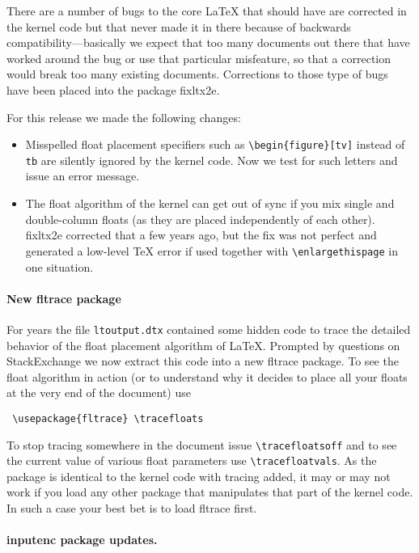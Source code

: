 \documentclass{ltnews}
\begin{document}
There are a number of bugs to the core \LaTeX{} that should have are
corrected in the kernel code but that never made it in there because
of backwards compatibility---basically we expect that too many
documents out there that have worked around the bug or use that
particular misfeature, so that a correction would break too many
existing documents. Corrections to those type of bugs have been placed
into the package \textsf{fixltx2e}.
 

For this release we made the following changes:
\begin{itemize}
\item
   Misspelled float placement specifiers such as
   \verb=\begin{figure}[tv]= instead of \texttt{tb} are silently
   ignored by the kernel code.  Now we test for such letters and issue
   an error message.
\item
   The float algorithm of the kernel can get out of sync if you mix
   single and double-column floats (as they are placed independently
   of each other). \textsf{fixltx2e} corrected that a few years ago,
   but the fix was not perfect and generated a low-level \TeX{} error
   if used together with \verb=\enlargethispage= in one situation.
\end{itemize}




\paragraph{New \textsf{fltrace} package}

For years the file \texttt{ltoutput.dtx} contained some hidden code to
trace the detailed behavior of the float placement algorithm of
\LaTeX. Prompted by questions on StackExchange we now extract this
code into a new \textsf{fltrace} package. To see the float algorithm
in action (or to understand why it decides to place all your floats at
the very end of the document) use
\begin{verbatim}
 \usepackage{fltrace} \tracefloats
\end{verbatim}
To stop tracing somewhere in the document issue
\verb=\tracefloatsoff= and to see the current value of various float
parameters use \verb=\tracefloatvals=. As the package is identical to
the kernel code with tracing added, it may or may not work if you load any
other package that manipulates that part of the kernel code. In such a
case your best bet is to load \textsf{fltrace} first.

\paragraph{\textsf{inputenc} package updates.}
\end{document}
